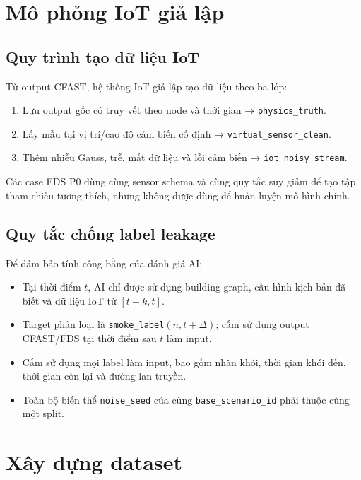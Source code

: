 \section{Mô phỏng IoT giả lập}
\label{sec:iotmethod}

\subsection{Quy trình tạo dữ liệu IoT}

Từ output CFAST, hệ thống IoT giả lập tạo dữ liệu theo ba lớp:

\begin{enumerate}
  \item Lưu output gốc có truy vết theo node và thời gian → \texttt{physics\_truth}.
  \item Lấy mẫu tại vị trí/cao độ cảm biến cố định → \texttt{virtual\_sensor\_clean}.
  \item Thêm nhiễu Gauss, trễ, mất dữ liệu và lỗi cảm biến → \texttt{iot\_noisy\_stream}.
\end{enumerate}

Các case FDS P0 dùng cùng sensor schema và cùng quy tắc suy giảm để tạo tập tham chiếu tương thích, nhưng không được dùng để huấn luyện mô hình chính.

\subsection{Quy tắc chống label leakage}

Để đảm bảo tính công bằng của đánh giá AI:
\begin{itemize}
  \item Tại thời điểm $t$, AI chỉ được sử dụng building graph, cấu hình kịch bản đã biết và dữ liệu IoT từ $[t-k,t]$.
  \item Target phân loại là \texttt{smoke\_label}$(n,t+\Delta)$; cấm sử dụng output CFAST/FDS tại thời điểm sau $t$ làm input.
  \item Cấm sử dụng mọi label làm input, bao gồm nhãn khói, thời gian khói đến, thời gian còn lại và đường lan truyền.
  \item Toàn bộ biến thể \texttt{noise\_seed} của cùng \texttt{base\_scenario\_id} phải thuộc cùng một split.
\end{itemize}

\section{Xây dựng dataset}
\label{sec:dataset}

